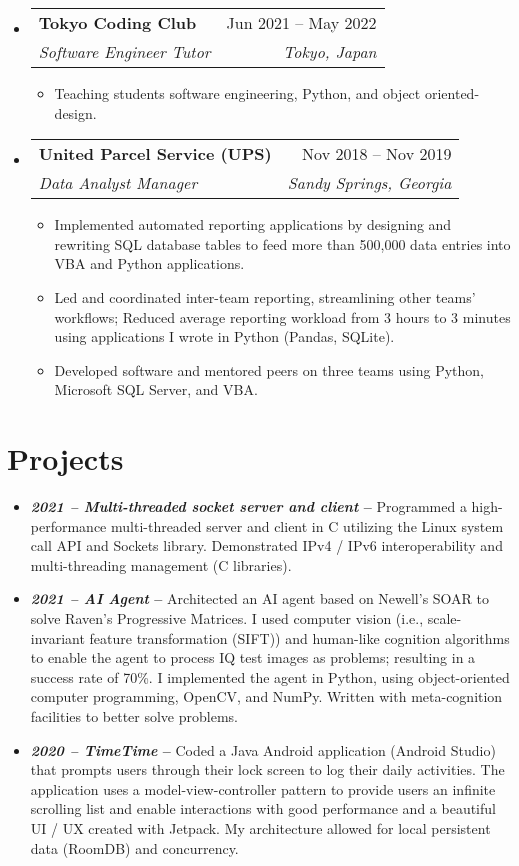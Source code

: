 \documentclass[12pt, letter]{article}
\makeatletter
\newcommand{\resumeItem}[1]{
  \item\small{
    {#1 \vspace{-2pt}}
  }
}
\newcommand{\resumeSubheading}[4]{
  \vspace{-2pt}\item
    \begin{tabular*}{0.97\textwidth}[t]{l@{\extracolsep{\fill}}r}
      \textbf{#1} & #2 \\
      \textit{\small#3} & \textit{\small #4} \\
    \end{tabular*}\vspace{-7pt}
}
\newcommand{\resumeSubHeadingListStart}{\begin{itemize}[leftmargin=0.15in, label={}]}
\newcommand{\resumeSubHeadingListEnd}{\end{itemize}}
\newcommand{\resumeItemListStart}{\begin{itemize}[noitemsep]} %
\newcommand{\resumeItemListEnd}{\end{itemize}\vspace{-16pt}}
\makeatother
\begin{document}
\resumeSubHeadingListStart
  \resumeSubheading
    {Tokyo Coding Club }{Jun 2021 -- May 2022}
    {Software Engineer Tutor}{Tokyo, Japan}
    \resumeItemListStart
      \resumeItem{Teaching students software engineering, Python, and object oriented-design.}
    \resumeItemListEnd
  \resumeSubHeadingListEnd

\resumeSubHeadingListStart
  \resumeSubheading
    {United Parcel Service (UPS)}{Nov 2018 -- Nov 2019}
    {Data Analyst Manager}{Sandy Springs, Georgia}
    \resumeItemListStart
      \resumeItem{Implemented automated reporting applications by designing and rewriting SQL database tables to feed more than 500,000 data entries into VBA and Python applications.}
      \resumeItem{Led and coordinated inter-team reporting, streamlining other teams' workflows; Reduced average reporting workload from 3 hours to 3 minutes using applications I wrote in Python (Pandas, SQLite).}
      \resumeItem{Developed software and mentored peers on three teams using Python, Microsoft SQL Server, and VBA.}
    \resumeItemListEnd
\resumeSubHeadingListEnd

\section{Projects}

\begin{itemize}
  \item {\small \textbf{\textit{2021 -- Multi-threaded socket server and client} --} Programmed a high-performance multi-threaded server and client in C utilizing the Linux system call API and Sockets library. Demonstrated IPv4 / IPv6 interoperability and multi-threading management (C libraries).}
  \item {\small \textbf{\textit{2021 -- AI Agent} --} Architected an AI agent based on Newell's SOAR to solve Raven's Progressive Matrices. I used computer vision (i.e., scale-invariant feature transformation (SIFT)) and human-like cognition algorithms to enable the agent to process IQ test images as problems; resulting in a success rate of 70\%. I implemented the agent in Python, using object-oriented computer programming, OpenCV, and NumPy. Written with meta-cognition facilities to better solve problems.}
  \item {\small \textbf{\textit{2020 -- TimeTime} --}  Coded a Java Android application (Android Studio) that prompts users through their lock screen to log their daily activities. The application uses a model-view-controller pattern to provide users an infinite scrolling list and enable interactions with good performance and a beautiful UI / UX created with Jetpack. My architecture allowed for local persistent data (RoomDB) and concurrency.}
\end{itemize}
\end{document}
